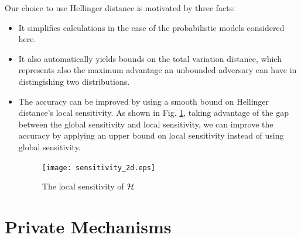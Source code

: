 \documentclass{article}
\begin{document}
Our choice to use Hellinger distance is motivated by three facts:
\begin{itemize}
  \item It simplifies calculations in the case of the probabilistic models considered here.
  
  \item It also automatically yields bounds on the total variation distance, which represents also the maximum advantage an unbounded adversary can have in distingishing two distributions. 

  \item The accuracy can be improved by using a smooth bound on Hellinger distance's local sensitivity. As shown in Fig. \ref{fig_sensitivity},
    taking advantage of the gap between the global sensitivity and local sensitivity, we can improve the accuracy by applying an upper bound on local sensitivity instead of using global sensitivity.
\begin{figure}[ht]
\centering
\texttt{[image: sensitivity\_2d.eps]}
\caption{{The local sensitivity of $\mathcal{H}$}}
\label{fig_sensitivity}
\end{figure}
\end{itemize}



\section{Private Mechanisms}
\label{sec_mechs}
\end{document}
